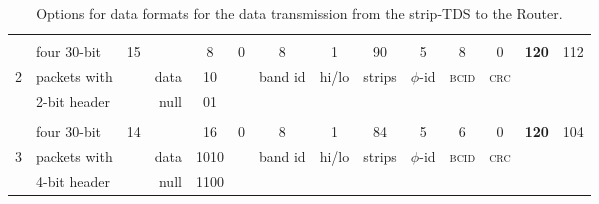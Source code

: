\begin{table}[htbp]
\begin{tabular}{llrrrrrrrrrrrr}
          & \multicolumn{1}{l}{} & \multicolumn{1}{c}{} &       &       &       &       &       &       &       &       &       &       & \multicolumn{1}{c}{} \\
          & four 30-bit & \multicolumn{1}{c}{15} &       & \multicolumn{1}{c}{8} & \multicolumn{1}{c}{0} & \multicolumn{1}{c}{8} & \multicolumn{1}{c}{1} & \multicolumn{1}{c}{90} & \multicolumn{1}{c}{5} & \multicolumn{1}{c}{8} & \multicolumn{1}{c}{0} & \multicolumn{1}{c}{\textbf{120}} & \multicolumn{1}{c}{112} \\
    2     & packets with & \multicolumn{1}{c}{} & data  & \multicolumn{1}{c}{10} & \multicolumn{1}{c}{} & \multicolumn{1}{c}{band id} & \multicolumn{1}{c}{hi/lo} & \multicolumn{1}{c}{strips} & \multicolumn{1}{c}{$\phi$-id} & \multicolumn{1}{c}{\textsc{bcid}} & \multicolumn{1}{c}{\textsc{crc}} & \multicolumn{1}{c}{\textbf{}} & \multicolumn{1}{c}{} \\
          & 2-bit header &       & null  & \multicolumn{1}{c}{01} & \multicolumn{1}{c}{} & \multicolumn{1}{c}{} & \multicolumn{1}{c}{} & \multicolumn{1}{c}{} & \multicolumn{1}{c}{} & \multicolumn{1}{c}{} & \multicolumn{1}{c}{} & \multicolumn{1}{c}{} & \multicolumn{1}{c}{} \\
          & \multicolumn{1}{l}{} & \multicolumn{1}{c}{} &       &       &       &       &       &       &       &       &       &       & \multicolumn{1}{c}{} \\
          & four 30-bit & \multicolumn{1}{c}{14} &       & \multicolumn{1}{c}{16} & \multicolumn{1}{c}{0} & \multicolumn{1}{c}{8} & \multicolumn{1}{c}{1} & \multicolumn{1}{c}{84} & \multicolumn{1}{c}{5} & \multicolumn{1}{c}{6} & \multicolumn{1}{c}{0} & \multicolumn{1}{c}{\textbf{120}} & \multicolumn{1}{c}{104} \\
    3     & packets with &       & data  & \multicolumn{1}{c}{1010} & \multicolumn{1}{c}{} & \multicolumn{1}{c}{band id} & \multicolumn{1}{c}{hi/lo} & \multicolumn{1}{c}{strips} & \multicolumn{1}{c}{$\phi$-id} & \multicolumn{1}{c}{\textsc{bcid}} & \multicolumn{1}{c}{\textsc{crc}} &       &  \\
          & 4-bit header & \multicolumn{1}{c}{} & null  & \multicolumn{1}{c}{1100} & \multicolumn{1}{c}{} & \multicolumn{1}{c}{} & \multicolumn{1}{c}{} & \multicolumn{1}{c}{} & \multicolumn{1}{c}{} & \multicolumn{1}{c}{} & \multicolumn{1}{c}{} & \multicolumn{1}{c}{} &  \\
    \bottomrule
    \end{tabular}%
   \caption{Options for data formats for the data transmission from the strip-TDS to the Router.}
   \label{tab:stripTDSout}%
\end{table}%


